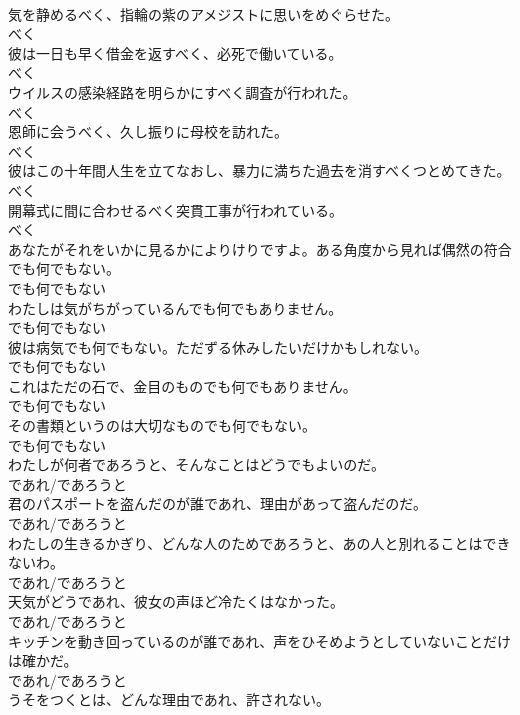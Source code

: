 \documentclass[8pt]{extreport}
\begin{document}
\begin{CJK}{UTF8}{min}
\\	気を静めるべく、指輪の紫のアメジストに思いをめぐらせた。	
\\	べく	
\\	彼は一日も早く借金を返すべく、必死で働いている。	
\\	べく	
\\	ウイルスの感染経路を明らかにすべく調査が行われた。	
\\	べく	
\\	恩師に会うべく、久し振りに母校を訪れた。	
\\	べく	
\\	彼はこの十年間人生を立てなおし、暴力に満ちた過去を消すべくつとめてきた。	
\\	べく	
\\	開幕式に間に合わせるべく突貫工事が行われている。	
\\	べく	
\\	あなたがそれをいかに見るかによりけりですよ。ある角度から見れば偶然の符合でも何でもない。	
\\	でも何でもない	
\\	わたしは気がちがっているんでも何でもありません。	
\\	でも何でもない	
\\	彼は病気でも何でもない。ただずる休みしたいだけかもしれない。	
\\	でも何でもない	
\\	これはただの石で、金目のものでも何でもありません。	
\\	でも何でもない	
\\	その書類というのは大切なものでも何でもない。	
\\	でも何でもない	
\\	わたしが何者であろうと、そんなことはどうでもよいのだ。	
\\	であれ/であろうと	
\\	君のパスポートを盗んだのが誰であれ、理由があって盗んだのだ。	
\\	であれ/であろうと	
\\	わたしの生きるかぎり、どんな人のためであろうと、あの人と別れることはできないわ。	
\\	であれ/であろうと	
\\	天気がどうであれ、彼女の声ほど冷たくはなかった。	
\\	であれ/であろうと	
\\	キッチンを動き回っているのが誰であれ、声をひそめようとしていないことだけは確かだ。	
\\	であれ/であろうと	
\\	うそをつくとは、どんな理由であれ、許されない。	

\end{CJK}
\end{document}
